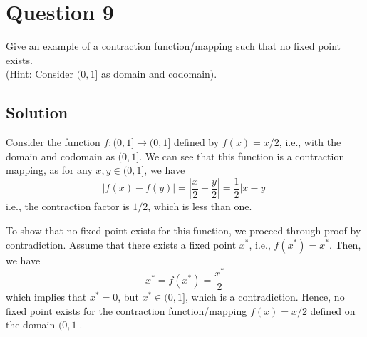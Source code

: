 \section*{Question 9}

Give an example of a contraction function/mapping such that no fixed point exists. \\
(Hint: Consider \( (0,1] \) as domain and codomain).

\subsection*{Solution}

Consider the function \( f: (0,1] \to (0,1] \) defined by \( f(x) = x/2 \), i.e., with the domain and codomain as \( (0,1] \).
We can see that this function is a contraction mapping, as for any \( x, y \in (0,1] \), we have
\[
    \vert f(x) - f(y) \vert = \left\vert \frac{x}{2} - \frac{y}{2} \right\vert = \frac{1}{2} \vert x - y \vert
\]
i.e., the contraction factor is \( 1/2 \), which is less than one.

To show that no fixed point exists for this function, we proceed through proof by contradiction.
Assume that there exists a fixed point \( x^* \), i.e., \( f(x^*) = x^* \).
Then, we have
\[
    x^* = f(x^*) = \frac{x^*}{2}
\]
which implies that \( x^* = 0 \), but \( x^* \in (0,1] \), which is a contradiction.
Hence, no fixed point exists for the contraction function/mapping \( f(x) = x/2 \) defined on the domain \( (0,1] \).
